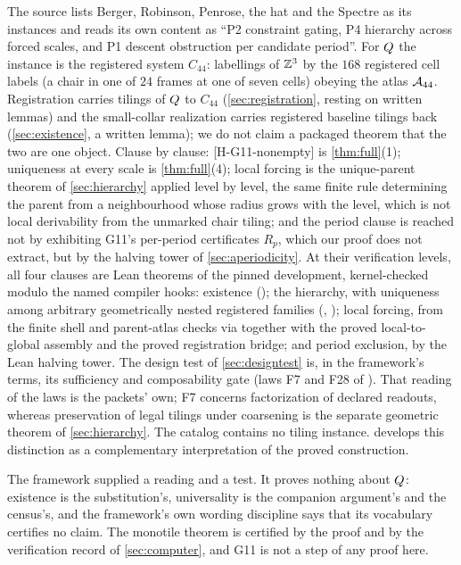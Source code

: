 \noindent The source lists Berger, Robinson, Penrose, the hat and the Spectre as its instances and
reads its own content as ``P2 constraint gating, P4 hierarchy across forced scales, and P1 descent
obstruction per candidate period''. For $Q$ the instance is the registered system $C_{44}$:
labellings of $\mathbb{Z}^3$ by the $168$ registered cell labels (a chair in one of $24$ frames at one of
seven cells) obeying the atlas $\mathcal{A}_{44}$. Registration carries tilings of $Q$ to $C_{44}$
(\cref{sec:registration}, resting on written lemmas) and the small-collar realization carries
registered baseline tilings back (\cref{sec:existence}, a written lemma); we do not claim a
packaged theorem that the two are one object. Clause by clause: [H-G11-nonempty] is
\cref{thm:full}(1); uniqueness at every scale is \cref{thm:full}(4); local forcing is the
unique-parent theorem of \cref{sec:hierarchy} applied level by level, the same finite rule
determining the parent from a neighbourhood whose radius grows with the level, which is not local
derivability from the unmarked chair tiling; and the period clause is reached not by exhibiting
G11's per-period certificates $R_p$, which our proof does not extract, but by the halving tower
of \cref{sec:aperiodicity}. At their verification levels, all four clauses are Lean theorems of
the pinned development, kernel-checked modulo the named compiler hooks: existence
(); the hierarchy, with uniqueness among arbitrary geometrically nested registered
families (, ); local
forcing, from the finite shell and parent-atlas checks via  together with the
proved local-to-global assembly and the proved registration bridge; and period exclusion, by the
Lean halving tower. The design test of \cref{sec:designtest} is, in the framework's terms,
its sufficiency and composability gate (laws F7 and F28 of \cite{Tsi26F4}). That reading
of the laws is the packets' own; F7 concerns factorization of declared readouts, whereas
preservation of legal tilings under coarsening is the separate geometric theorem of
\cref{sec:hierarchy}. The catalog contains no tiling instance.  develops
this distinction as a complementary interpretation of the proved construction.

The framework supplied a reading and a test. It proves nothing about $Q$: existence is the
substitution's, universality is the companion argument's and the census's, and the framework's
own wording discipline says that its vocabulary certifies no claim. The monotile theorem
is certified by the proof and by the verification record of \cref{sec:computer},
and G11 is not a step of any proof here.

